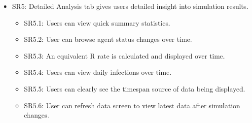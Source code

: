 \begin{itemize}
\begin{itemize}
        \item\label{req:SR4.4} SR4.4: A live map of agent positions is displayed during the simulation with colour coding to indicate health status.
        \item\label{req:SR4.5} SR4.5: User can pan and zoom around map area to explore agent interactions.
        \item\label{req:SR4.6} SR4.6: Population status summary is displayed with key metrics (e.g. susceptible, exposed, infected \& recovered counts).
        \item\label{req:SR4.7} SR4.7: Infection metrics are displayed (e.g. total infections, active cases).
    \end{itemize}
    \item\label{req:SR5} SR5: Detailed Analysis tab gives users detailed insight into simulation results.
    \begin{itemize}
        \item\label{req:SR5.1} SR5.1: Users can view quick summary statistics.
        \item\label{req:SR5.2} SR5.2: User can browse agent status changes over time.
        \item\label{req:SR5.3} SR5.3: An equivalent R rate is calculated and displayed over time.
        \item\label{req:SR5.4} SR5.4: Users can view daily infections over time.
        \item\label{req:SR5.5} SR5.5: Users can clearly see the timespan source of data being displayed.
        \item\label{req:SR5.6} SR5.6: User can refresh data screen to view latest data after simulation changes.
    \end{itemize}
\end{itemize}


